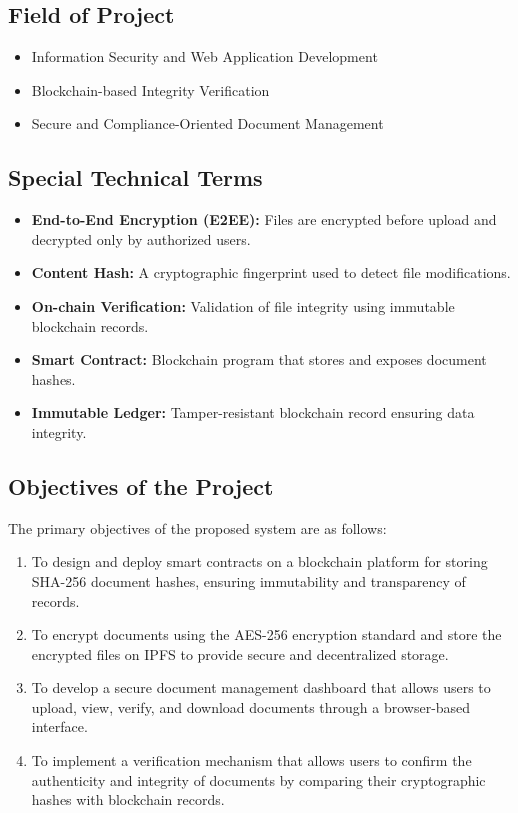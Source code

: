 \documentclass[12pt]{article}
\begin{document}
\subsection{Field of Project}

\begin{itemize}
\item Information Security and Web Application Development
\item Blockchain-based Integrity Verification
\item Secure and Compliance-Oriented Document Management
\end{itemize}

\subsection{Special Technical Terms}

\begin{itemize}
\item \textbf{End-to-End Encryption (E2EE):} Files are encrypted before upload and decrypted only by authorized users.
\item \textbf{Content Hash:} A cryptographic fingerprint used to detect file modifications.
\item \textbf{On-chain Verification:} Validation of file integrity using immutable blockchain records.
\item \textbf{Smart Contract:} Blockchain program that stores and exposes document hashes.
\item \textbf{Immutable Ledger:} Tamper-resistant blockchain record ensuring data integrity.
\end{itemize}

\subsection{Objectives of the Project}

The primary objectives of the proposed system are as follows:

\begin{enumerate}
\item To design and deploy smart contracts on a blockchain platform for storing SHA-256 document hashes, ensuring immutability and transparency of records.
\item To encrypt documents using the AES-256 encryption standard and store the encrypted files on IPFS to provide secure and decentralized storage.
\item To develop a secure document management dashboard that allows users to upload, view, verify, and download documents through a browser-based interface.
\item To implement a verification mechanism that allows users to confirm the authenticity and integrity of documents by comparing their cryptographic hashes with blockchain records.
\end{enumerate}\newpage
\end{document}
